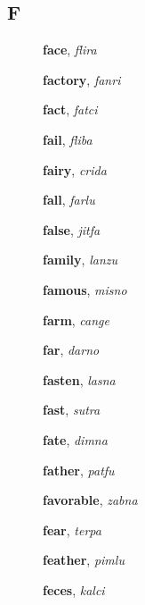 \documentclass[12pt]{book}
\begin{document}
\subsection{F} %

\begin{description}

\item[ ] \textbf{face}, \textit{flira}

\item[ ] \textbf{factory}, \textit{fanri}

\item[ ] \textbf{fact}, \textit{fatci}

\item[ ] \textbf{fail}, \textit{fliba}

\item[ ] \textbf{fairy}, \textit{crida}

\item[ ] \textbf{fall}, \textit{farlu}

\item[ ] \textbf{false}, \textit{jitfa}

\item[ ] \textbf{family}, \textit{lanzu}

\item[ ] \textbf{famous}, \textit{misno}

\item[ ] \textbf{farm}, \textit{cange}

\item[ ] \textbf{far}, \textit{darno}

\item[ ] \textbf{fasten}, \textit{lasna}

\item[ ] \textbf{fast}, \textit{sutra}

\item[ ] \textbf{fate}, \textit{dimna}

\item[ ] \textbf{father}, \textit{patfu}

\item[ ] \textbf{favorable}, \textit{zabna}

\item[ ] \textbf{fear}, \textit{terpa}

\item[ ] \textbf{feather}, \textit{pimlu}

\item[ ] \textbf{feces}, \textit{kalci}


\end{description}
\end{document}
